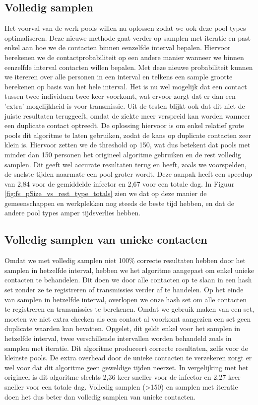 \begin{appendices}
\subsection{Volledig samplen}
Het voorval van de werk pools willen nu oplossen zodat we ook deze pool types optimaliseren. Deze nieuwe methode gaat verder op samplen met iteratie en past enkel aan hoe we de contacten binnen eenzelfde interval bepalen. Hiervoor berekenen we de contactprobabiliteit op een andere manier wanneer we binnen eenzelfde interval contacten willen bepalen. Met deze nieuwe probabiliteit kunnen we itereren over alle personen in een interval en telkens een sample grootte berekenen op basis van het hele interval. Het is nu wel mogelijk dat een contact tussen twee individuen twee keer voorkomt, wat ervoor zorgt dat er dan een 'extra' mogelijkheid is voor transmissie. Uit de testen blijkt ook dat dit niet de juiste resultaten teruggeeft, omdat de ziekte meer verspreid kan worden wanneer een duplicate contact optreedt. De oplossing hiervoor is om enkel relatief grote pools dit algoritme te laten gebruiken, zodat de kans op duplicate contacten zeer klein is. Hiervoor zetten we de threshold op 150, wat dus betekent dat pools met minder dan 150 personen het origineel algoritme gebruiken en de rest volledig samplen. Dit geeft wel accurate resultaten terug en heeft, zoals we voorspelden, de snelste tijden naarmate een pool groter wordt. Deze aanpak heeft een speedup van 2,84 voor de gemiddelde infector en 2,67 voor een totale dag. In Figuur \ref{fig:fs_pSize_vs_rest_type_totals} zien we dat op deze manier de gemeenschappen en werkplekken nog steeds de beste tijd hebben, en dat de andere pool types amper tijdsverlies hebben.

\subsection{Volledig samplen van unieke contacten}
Omdat we met volledig samplen niet 100\% correcte resultaten hebben door het samplen in hetzelfde interval, hebben we het algoritme aangepast om enkel unieke contacten te behandelen. Dit doen we door alle contacten op te slaan in een hash set zonder ze te registreren of transmissies verder af te handelen. Op het einde van samplen in hetzelfde interval, overlopen we onze hash set om alle contacten te registreren en transmissies te berekenen. Omdat we gebruik maken van een set, moeten we niet extra checken als een contact al voorkomt aangezien een set geen duplicate waarden kan bevatten. Opgelet, dit geldt enkel voor het samplen in hetzelfde interval, twee verschillende intervallen worden behandeld zoals in samplen met iteratie. Dit algoritme produceert correcte resultaten, zelfs voor de kleinste pools. De extra overhead door de unieke contacten te verzekeren zorgt er wel voor dat dit algoritme geen geweldige tijden neerzet. In vergelijking met het origineel is dit algoritme slechts 2,36 keer sneller voor de infector en 2,27 keer sneller voor een totale dag. Volledig samplen (>150) en samplen met iteratie doen het dus beter dan volledig samplen van unieke contacten.


\end{appendices}
